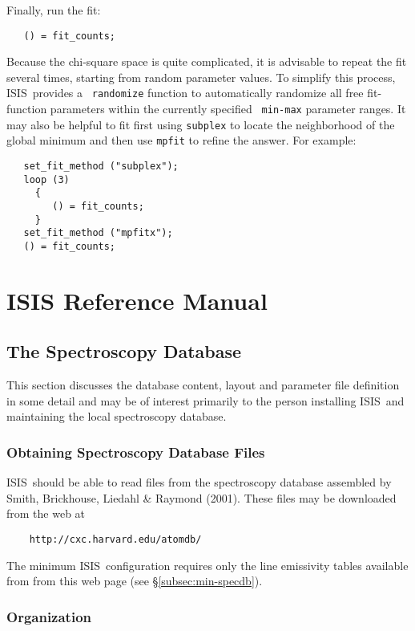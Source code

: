 \documentclass{book}
\newcommand{\isisx}{{\sc ISIS~}}
\begin{document}
{Finally, run the fit:
\begin{verbatim}
   () = fit_counts;
\end{verbatim}

Because the chi-square space is quite complicated, it is advisable
to repeat the fit several times, starting from random parameter
values.  To simplify this process, \isisx provides a {\tt
randomize} function to automatically randomize all free
fit-function parameters within the currently specified {\tt
min-max} parameter ranges. It may also be helpful to fit first
using {\tt subplex} to locate the neighborhood of the global
minimum and then use {\tt mpfit} to refine the answer.  For
example:

\begin{verbatim}
   set_fit_method ("subplex");
   loop (3)
     {
        () = fit_counts;
     }
   set_fit_method ("mpfitx");
   () = fit_counts;
\end{verbatim}

\part{ISIS Reference Manual \label{part:refman}}

\chapter{The Spectroscopy Database}
\label{chap:specdb}

This section discusses the database content, layout and parameter file
definition in some detail and may be of interest primarily to the person
installing \isisx and maintaining the local spectroscopy database.

\section{Obtaining Spectroscopy Database Files}

\isisx should be able to read files from the spectroscopy database assembled
by Smith, Brickhouse, Liedahl \& Raymond (2001).  These files may be
downloaded from the web at
\begin{verbatim}
    http://cxc.harvard.edu/atomdb/
\end{verbatim}
The minimum \isisx configuration requires only the line emissivity tables
available from from this web page (see \S \ref{subsec:min-specdb}).

\section{Organization}

}
\end{document}
